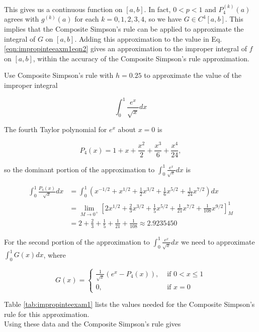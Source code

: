 This gives us a continuous function on $[a, b]$. In fact, $0<p<1$ and $P_{4}^{(k)}(a)$ agrees with $g^{(k)}(a)$ for each $k=0,1,2,3,4$, so we have $G \in C^{4}[a, b]$. This implies that the Composite Simpson's rule can be applied to approximate the integral of $G$ on $[a, b]$. Adding this approximation to the value in Eq. \ref{eqn:impropinteeaxm1eqn2} gives an approximation to the improper integral of $f$ on $[a, b]$, within the accuracy of the Composite Simpson's rule approximation.

\begin{example}
Use Composite Simpson's rule with $h=0.25$ to approximate the value of the improper integral

$$
\int_{0}^{1} \frac{e^{x}}{\sqrt{x}} d x
$$
\end{example}

\begin{mysolution}
The fourth Taylor polynomial for $e^{x}$ about $x=0$ is

$$
P_{4}(x)=1+x+\frac{x^{2}}{2}+\frac{x^{3}}{6}+\frac{x^{4}}{24},
$$

so the dominant portion of the approximation to $\int_{0}^{1} \frac{e^{x}}{\sqrt{x}} d x$ is

$$
\begin{aligned}
\int_{0}^{1} \frac{P_{4}(x)}{\sqrt{x}} d x & =\int_{0}^{1}\left(x^{-1 / 2}+x^{1 / 2}+\frac{1}{2} x^{3 / 2}+\frac{1}{6} x^{5 / 2}+\frac{1}{24} x^{7 / 2}\right) d x \\
& =\lim _{M \rightarrow 0^{+}}\left[2 x^{1 / 2}+\frac{2}{3} x^{3 / 2}+\frac{1}{5} x^{5 / 2}+\frac{1}{21} x^{7 / 2}+\frac{1}{108} x^{9 / 2}\right]_{M}^{1} \\
& =2+\frac{2}{3}+\frac{1}{5}+\frac{1}{21}+\frac{1}{108} \approx 2.9235450
\end{aligned}
$$

For the second portion of the approximation to $\int_{0}^{1} \frac{e^{x}}{\sqrt{x}} d x$ we need to approximate $\int_{0}^{1} G(x) d x$, where

$$
G(x)= \begin{cases}\frac{1}{\sqrt{x}}\left(e^{x}-P_{4}(x)\right), & \text { if } 0<x \leq 1 \\ 0, & \text { if } x=0\end{cases}
$$



Table \ref{tab:impropinteexam1} lists the values needed for the Composite Simpson's rule for this approximation.\\
Using these data and the Composite Simpson's rule gives


\end{mysolution}
